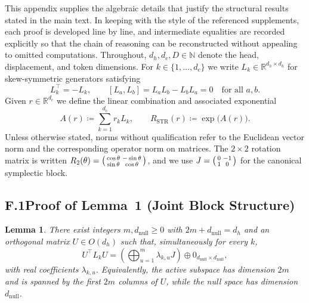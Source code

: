 \documentclass[11pt]{article}
\newcommand{\Real}{\mathbb{R}}
\newtheorem{lemma}{Lemma}
\begin{document}
This appendix supplies the algebraic details that justify the structural results stated in the main text.
In keeping with the style of the referenced supplements, each proof is developed line by line, and
intermediate equalities are recorded explicitly so that the chain of reasoning can be reconstructed
without appealing to omitted computations.  Throughout, $d_h,d_c,D\in\mathbb{N}$ denote the head,
displacement, and token dimensions.  For $k\in\{1,\dots,d_c\}$ we write $L_k\in\Real^{d_h\times d_h}$
for skew-symmetric generators satisfying
\begin{equation}
  L_k^\top = -L_k,
  \qquad
  [L_a,L_b] = L_aL_b - L_bL_a = 0
  \quad\text{for all } a,b.
  \label{eq:appendix-commuting-generators}
\end{equation}
Given $r\in\Real^{d_c}$ we define the linear combination and associated exponential
\begin{equation}
  A(r) \coloneqq \sum_{k=1}^{d_c} r_k L_k,
  \qquad
  R_{\mathrm{STR}}(r) \coloneqq \exp\!\big(A(r)\big).
  \label{eq:appendix-def-A-R}
\end{equation}
Unless otherwise stated, norms without qualification refer to the Euclidean vector norm and the
corresponding operator norm on matrices.  The $2\times 2$ rotation matrix is written
$R_2(\theta) = \begin{psmallmatrix}\cos\theta & -\sin\theta\\ \sin\theta & \cos\theta\end{psmallmatrix}$,
and we use $J = \begin{psmallmatrix}0 & -1\\ 1 & 0\end{psmallmatrix}$ for the canonical symplectic block.

\subsection*{F.1\quad Proof of Lemma~1 (Joint Block Structure)}

\begin{lemma}\label{lem:appendix-block-structure}
There exist integers $m,d_{\mathrm{null}}\ge 0$ with $2m+d_{\mathrm{null}} = d_h$ and an orthogonal
matrix $U\in O(d_h)$ such that, simultaneously for every $k$,
\begin{equation}
  U^\top L_k U =
  \left(\bigoplus_{u=1}^{m} \lambda_{k,u} J\right)
  \oplus 0_{d_{\mathrm{null}}\times d_{\mathrm{null}}},
  \label{eq:appendix-block-L}
\end{equation}
with real coefficients $\lambda_{k,u}$.  Equivalently, the active subspace has dimension $2m$ and is
spanned by the first $2m$ columns of $U$, while the null space has dimension $d_{\mathrm{null}}$.
\end{lemma}
\end{document}
